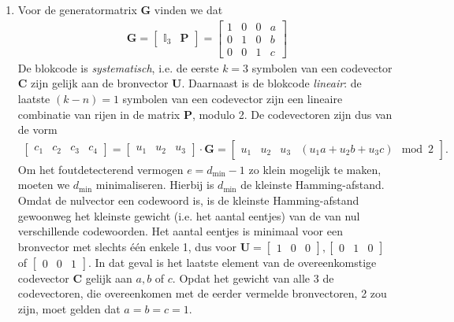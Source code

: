 \documentclass{kuburgiearticle}
\begin{document}
	\begin{enumerate}
		\item \renewcommand{\arraystretch}{1}
		Voor de generatormatrix \(\mathbf{G}\) vinden we dat \begin{align*}
			\mathbf{G} = \left[\begin{array}{c|c}
				\mathbb{I}_3 & \mathbf{P}
			\end{array}\right] = \left[\begin{array}{ccc|c}
				1 & 0 & 0 & a \\
				0 & 1 & 0 & b \\
				0 & 0 & 1 & c
			\end{array}\right]
		\end{align*}
		De blokcode is \textit{systematisch}, i.e. de eerste \(k=3\) symbolen van een codevector \(\mathbf{C}\) zijn gelijk aan de bronvector \(\mathbf{U}\). Daarnaast is de blokcode \textit{lineair}: de laatste \((k-n)=1\) symbolen van een codevector zijn een lineaire combinatie van rijen in de matrix \(\mathbf{P}\), modulo 2. De codevectoren zijn dus van de vorm \begin{align*}
			\begin{bmatrix}
				c_1 & c_2 & c_3 & c_4
			\end{bmatrix} = \begin{bmatrix}
				u_1 & u_2 & u_3
			\end{bmatrix} \cdot \mathbf{G} = \left[\begin{array}{ccc|c}
				u_1 & u_2 & u_3 & (u_1 a + u_2 b + u_3 c) \mod 2
			\end{array}\right].
		\end{align*}
		Om het foutdetecterend vermogen \(e=d_{\min} - 1\) zo klein mogelijk te maken, moeten we \(d_{\min}\) minimaliseren. Hierbij is \(d_{\min}\) de kleinste Hamming-afstand. Omdat de nulvector een codewoord is, is de kleinste Hamming-afstand gewoonweg het kleinste gewicht (i.e. het aantal eentjes) van de van nul verschillende codewoorden. Het aantal eentjes is minimaal voor een bronvector met slechts één enkele 1, dus voor \(\mathbf{U} = \begin{bmatrix}
			1 & 0 & 0
		\end{bmatrix}, \begin{bmatrix}
		0 & 1 & 0
		\end{bmatrix}\) of \(\begin{bmatrix}
		0 & 0 & 1
		\end{bmatrix}\). In dat geval is het laatste element van de overeenkomstige codevector \(\mathbf{C}\) gelijk aan \(a,b\) of \(c\). Opdat het gewicht van alle 3 de codevectoren, die overeenkomen met de eerder vermelde bronvectoren, 2 zou zijn, moet gelden dat \(a=b=c=1\).


\end{enumerate}
\end{document}
